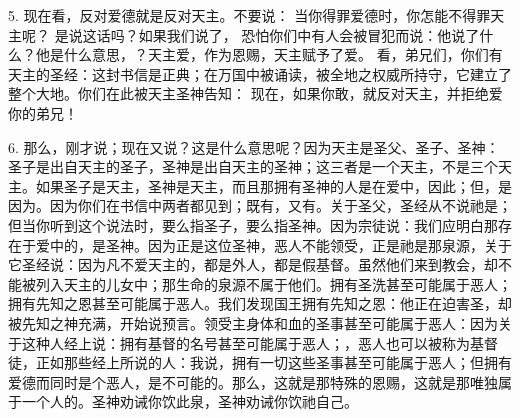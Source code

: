 5. 现在看，反对爱德就是反对天主。不要说： 当你得罪爱德时，你怎能不得罪天主呢？ 是说这话吗？如果我们说了， 恐怕你们中有人会被冒犯而说：他说了什么？他是什么意思，？天主爱，作为恩赐，天主赋予了爱。 看，弟兄们，你们有天主的圣经：这封书信是正典；在万国中被诵读，被全地之权威所持守，它建立了整个大地。你们在此被天主圣神告知： 现在，如果你敢，就反对天主，并拒绝爱你的弟兄！\par

6. 那么，刚才说；现在又说？这是什么意思呢？因为天主是圣父、圣子、圣神：圣子是出自天主的圣子，圣神是出自天主的圣神；这三者是一个天主，不是三个天主。如果圣子是天主，圣神是天主，而且那拥有圣神的人是在爱中，因此；但，是因为。因为你们在书信中两者都见到；既有，又有。关于圣父，圣经从不说祂是；但当你听到这个说法时，要么指圣子，要么指圣神。因为宗徒说：我们应明白那存在于爱中的，是圣神。因为正是这位圣神，恶人不能领受，正是祂是那泉源，关于它圣经说：因为凡不爱天主的，都是外人，都是假基督。虽然他们来到教会，却不能被列入天主的儿女中；那生命的泉源不属于他们。拥有圣洗甚至可能属于恶人；拥有先知之恩甚至可能属于恶人。我们发现国王拥有先知之恩：他正在迫害圣，却被先知之神充满，开始说预言。领受主身体和血的圣事甚至可能属于恶人：因为关于这种人经上说：拥有基督的名号甚至可能属于恶人；，恶人也可以被称为基督徒，正如那些经上所说的人：我说，拥有一切这些圣事甚至可能属于恶人；但拥有爱德而同时是个恶人，是不可能的。那么，这就是那特殊的恩赐，这就是那唯独属于一个人的。圣神劝诫你饮此泉，圣神劝诫你饮祂自己。\par

